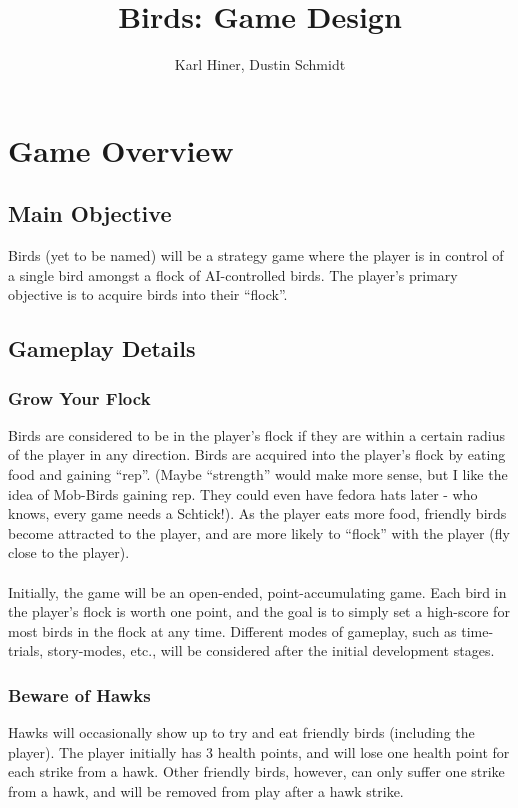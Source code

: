 \documentclass{article}
\begin{document}
\title{Birds: Game Design}
\author{Karl Hiner, Dustin Schmidt}
\maketitle
\tableofcontents

\section{Game Overview}
\subsection{Main Objective}
Birds (yet to be named) will be a strategy game where the player is in control of a single bird amongst a flock of AI-controlled birds.  The player's primary objective is to acquire birds into their ``flock''.
\subsection{Gameplay Details}
\subsubsection{Grow Your Flock}
Birds are considered to be in the player's flock if they are within a certain radius of the player in any direction.  Birds are acquired into the player's flock by eating food and gaining ``rep''. (Maybe ``strength'' would make more sense, but I like the idea of Mob-Birds gaining rep.  They could even have fedora hats later - who knows, every game needs a Schtick!).  As the player eats more food, friendly birds become attracted to the player, and are more likely to ``flock'' with the player (fly close to the player).
\\\\
Initially, the game will be an open-ended, point-accumulating game.  Each bird in the player's flock is worth one point, and the goal is to simply set a high-score for most birds in the flock at any time.  Different modes of gameplay, such as time-trials, story-modes, etc., will be considered after the initial development stages.

\subsubsection{Beware of Hawks}
Hawks will occasionally show up to try and eat friendly birds (including the player).  The player initially has 3 health points, and will lose one health point for each strike from a hawk.  Other friendly birds, however, can only suffer one strike from a hawk, and will be removed from play after a hawk strike.
\end{document}
